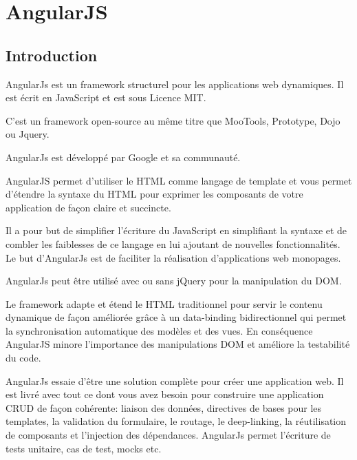 \section{AngularJS}
\label{ch:angularjs}

\subsection{Introduction}

AngularJs est un framework structurel pour les applications web dynamiques. Il est écrit en JavaScript et est sous Licence MIT.

C’est un framework open-source au même titre que MooTools, Prototype, Dojo ou Jquery.

AngularJs est développé par Google et sa communauté.

AngularJS permet d’utiliser le HTML comme langage de template et vous permet d’étendre la syntaxe du HTML pour exprimer les composants de votre application de façon claire et succincte.

Il a pour but de simplifier l’écriture du JavaScript en simplifiant la syntaxe et de combler les faiblesses de ce langage en lui ajoutant de nouvelles fonctionnalités. Le but d’AngularJs est de faciliter la réalisation d’applications web monopages.

AngularJs peut être utilisé avec ou sans jQuery pour la manipulation du DOM.

Le framework adapte et étend le HTML traditionnel pour servir le contenu dynamique de façon améliorée grâce à un data-binding bidirectionnel qui permet la synchronisation automatique des modèles et des vues. En conséquence AngularJS minore l’importance des manipulations DOM et améliore la testabilité du code.

AngularJs essaie d’être une solution complète pour créer une application web. Il est livré avec tout ce dont vous avez besoin pour construire une application CRUD de façon cohérente: liaison des données, directives de bases pour les templates, la validation du formulaire, le routage, le deep-linking, la réutilisation de composants et l’injection des dépendances. AngularJs permet l’écriture de tests unitaire, cas de test, mocks etc.




